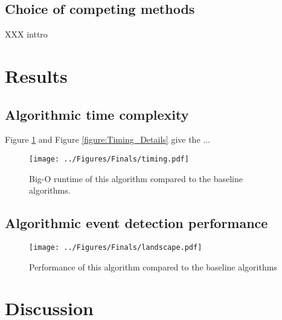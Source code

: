 \documentclass[%
  aip,12pt,tightenlines,
  amsthm,
 amsmath,amssymb
]{article}
\newcommand{\fRef}[1]{Figure \ref{figure:#1}}
\newcommand{\fLabel}[1]{\label{figure:#1}}
\newcommand{\sLabel}[1]{\label{section:#1}}
\newcommand{\pcaption}[1]{\caption{\noindent#1}}
\newcommand{\pEndF}[0]{ \\ }
\newcommand{\pStartF}[0]{ }
\begin{document}
\subsection{\sLabel{Compare}Choice of competing methods}

XXX inttro

\section{\sLabel{Results}Results}

\subsection{\sLabel{Timing}Algorithmic time complexity}

\fRef{Timing} and \fRef{Timing_Details} give the ...

\begin{figure}
\centering
\texttt{[image: ../Figures/Finals/timing.pdf]}%
\pcaption{\noindent\fLabel{Timing}\pStartF  Big-O runtime of this algorithm compared to the baseline algorithms.\pEndF}
\end{figure}

\subsection{\sLabel{Performance}Algorithmic event detection performance}

\begin{figure}
\centering
\texttt{[image: ../Figures/Finals/landscape.pdf]}%
\pcaption{\noindent\fLabel{Performance}\pStartF Performance of this algorithm compared to the baseline algorithms  \pEndF }
\end{figure}



\section{\sLabel{Discussion}Discussion}
\end{document}
